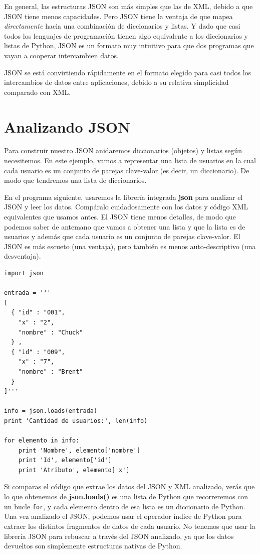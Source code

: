 En general, las estructuras JSON son más simples que las de XML, debido a que JSON tiene
menos capacidades. Pero JSON tiene la ventaja de que mapea {\em directamente} hacia una
combinación de diccionarios y listas. Y dado que casi todos los lenguajes de programación
tienen algo equivalente a los diccionarios y listas de Python, JSON es un formato
muy intuitivo para que dos programas que vayan a cooperar intercambien datos.

JSON se está convirtiendo rápidamente en el formato elegido para casi todos los intercambios
de datos entre aplicaciones, debido a su relativa simplicidad comparado con XML.

\section{Analizando JSON}

Para construir nuestro JSON anidaremos diccionarios (objetos) y listas según necesitemos.
En este ejemplo, vamos a representar una lista de usuarios en la cual cada usuario es un
conjunto de parejas clave-valor (es decir, un diccionario). De modo que tendremos una lista
de diccionarios.

En el programa siguiente, usaremos la librería integrada {\bf json} para analizar
el JSON y leer los datos. Compáralo cuidadosamente con los datos y código XML
equivalentes que usamos antes. El JSON tiene menos detalles, de modo que podemos saber de
antemano que vamos a obtener una lista y que la lista es de usuarios y además que cada usuario es un
conjunto de parejas clave-valor. El JSON es más escueto (una ventaja), pero también es
menos auto-descriptivo (una desventaja).

\beforeverb
\begin{verbatim}
import json

entrada = '''
[
  { "id" : "001",
    "x" : "2",
    "nombre" : "Chuck"
  } ,
  { "id" : "009",
    "x" : "7",
    "nombre" : "Brent"
  } 
]'''

info = json.loads(entrada)
print 'Cantidad de usuarios:', len(info)

for elemento in info:
    print 'Nombre', elemento['nombre']
    print 'Id', elemento['id']
    print 'Atributo', elemento['x']
\end{verbatim}
\afterverb
%
Si comparas el código que extrae los datos del JSON y XML analizado,
verás que lo que obtenemos de {\bf json.loads()} es una lista de Python
que recorreremos con un bucle {\tt for}, y cada elemento dentro de esa lista
es un diccionario de Python. Una vez analizado el JSON, podemos usar el operador
índice de Python para extraer los distintos fragmentos de datos de cada usuario. No
tenemos que usar la librería JSON para rebuscar a través del JSON analizado, ya que los
datos devueltos son simplemente estructuras nativas de Python.

